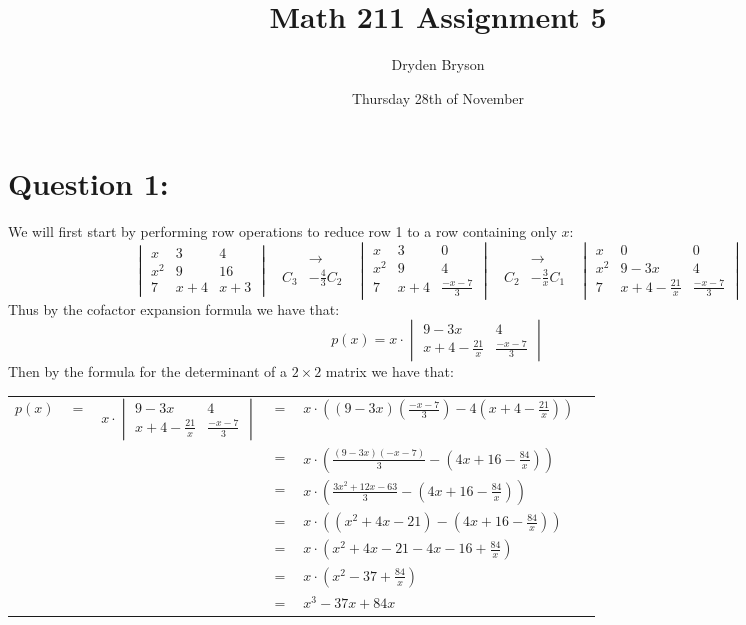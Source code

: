 \documentclass{article}
\title{Math 211 Assignment 5}
\author{Dryden Bryson}
\date{Thursday 28th of November}
\begin{document}
\maketitle
\newpage
\section*{Question 1:}
We will first start by performing row operations to reduce row 1 to a row containing only $x$:
$$\begin{vmatrix}
x&3&4\\
x^{2}&9&16\\
7&x+4&x+3
\end{vmatrix}\;\;\begin{aligned}
    &\rightarrow\\
    C_{3}&-\frac{4}{3}C_{2}
\end{aligned}\;\;\begin{vmatrix}
x&3&0\\
x^{2}&9&4\\
7&x+4&\frac{-x-7}{3}
\end{vmatrix}\;\;\begin{aligned}
    &\rightarrow\\
    C_{2}&-\frac{3}{x}C_{1}
\end{aligned}\;\;\begin{vmatrix}
    x&0&0\\
    x^{2}&9-3x&4\\
    7&x+4-\frac{21}{x}&\frac{-x-7}{3}
    \end{vmatrix}
$$
Thus by the cofactor expansion formula we have that:
$$p(x)=x\cdot \begin{vmatrix}
9-3x&4\\
x+4-\frac{21}{x}&\frac{-x-7}{3}
\end{vmatrix}$$
Then by the formula for the determinant of a $2\times 2$ matrix we have that:
\begin{table}[htp]
\centering
\begin{tabular}{cccclc}
  $p(x)$ & $=$ & $x\cdot \begin{vmatrix}9-3x&4\\x+4-\frac{21}{x}&\frac{-x-7}{3} \end{vmatrix}$ & $=$ & $x\cdot ((9-3x)(\frac{-x-7}{3})-4(x+4-\frac{21}{x}))$  &   \\
        && & $=$ & $x\cdot (\frac{(9-3x)(-x-7)}{3}-(4x+16-\frac{84}{x}))$  &   \\
        && & $=$ & $x\cdot (\frac{3x^{2}+12x-63}{3}-(4x+16-\frac{84}{x}))$  &   \\
        && & $=$ & $x\cdot ((x^{2}+4x-21)-(4x+16-\frac{84}{x}))$  &   \\
        && & $=$ & $x\cdot (x^{2}+4x-21-4x-16+\frac{84}{x})$  &   \\
        && & $=$ & $x\cdot (x^{2}-37+\frac{84}{x})$  &   \\
        && & $=$ & $x^{3}-37x+84x$  &   \\
\end{tabular}
\end{table}\\
\end{document}
